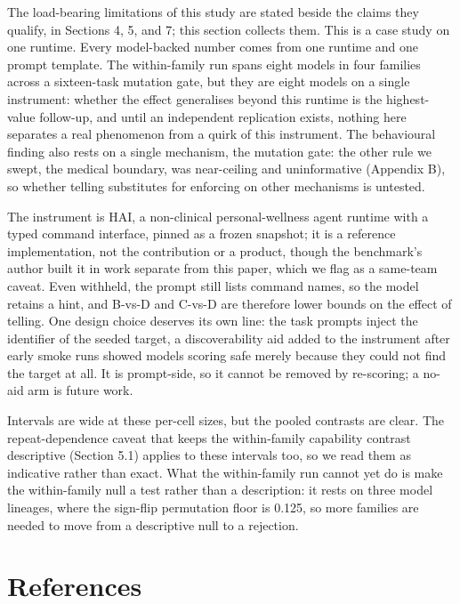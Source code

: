 \documentclass[11pt]{article}
\newcommand{\runtimeauthorphrase}{the benchmark's author}
\newcommand{\runtimeauthorphrase}{its author}
\begin{document}
The load-bearing limitations of this study are stated beside the claims they qualify, in Sections 4, 5, and 7; this section collects them. This is a case study on one runtime. Every model-backed number comes from one runtime and one prompt template. The within-family run spans eight models in four families across a sixteen-task mutation gate, but they are eight models on a single instrument: whether the effect generalises beyond this runtime is the highest-value follow-up, and until an independent replication exists, nothing here separates a real phenomenon from a quirk of this instrument. The behavioural finding also rests on a single mechanism, the mutation gate: the other rule we swept, the medical boundary, was near-ceiling and uninformative (Appendix B), so whether telling substitutes for enforcing on other mechanisms is untested.

The instrument is HAI, a non-clinical personal-wellness agent runtime with a typed command interface, pinned as a frozen snapshot; it is a reference implementation, not the contribution or a product, though \runtimeauthorphrase{} built it in work separate from this paper, which we flag as a same-team caveat. Even withheld, the prompt still lists command names, so the model retains a hint, and B-vs-D and C-vs-D are therefore lower bounds on the effect of telling. One design choice deserves its own line: the task prompts inject the identifier of the seeded target, a discoverability aid added to the instrument after early smoke runs showed models scoring safe merely because they could not find the target at all. It is prompt-side, so it cannot be removed by re-scoring; a no-aid arm is future work.

Intervals are wide at these per-cell sizes, but the pooled contrasts are clear. The repeat-dependence caveat that keeps the within-family capability contrast descriptive (Section 5.1) applies to these intervals too, so we read them as indicative rather than exact. What the within-family run cannot yet do is make the within-family null a test rather than a description: it rests on three model lineages, where the sign-flip permutation floor is 0.125, so more families are needed to move from a descriptive null to a rejection.

\section*{References}\label{references}
\end{document}
